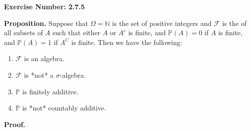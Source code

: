 \documentclass{article}
\begin{document}
\noindent \textbf{Exercise Number: 2.7.5}  %

\medskip 

\noindent \textbf{Proposition.} Suppose that $\Omega = \mathbb{N}$ is the set of positive integers 
and $\mathcal{F}$ is the of all subsets of $A$ such that either $A$ or $A^c$ is finite, and 
$\mathbb{P}(A) = 0$ if $A$ is finite, and $\mathbb{P}(A) = 1$ if $A^C$ is finite. Then we have
the following:

\begin{enumerate}

\item $\mathcal{F}$ is an algebra. 

\item $\mathcal{F}$ is *not* a $\sigma$-algebra.

\item $\mathbb{P}$ is finitely additive. 

\item $\mathbb{P}$ is *not* countably additive. 

\end{enumerate}

\bigskip

\noindent \textbf{Proof.}  

\medskip
\end{document}
